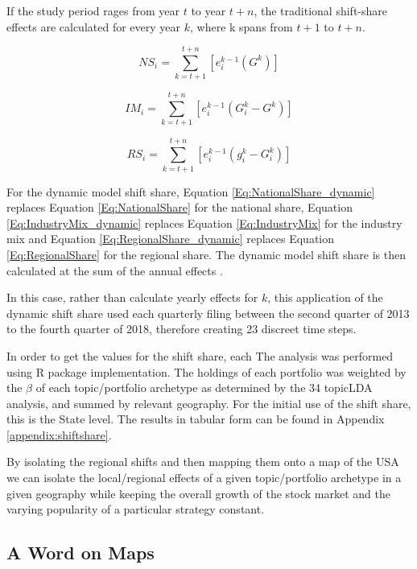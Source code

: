 If the study period rages from year $t$ to year $t+n$, the traditional shift-share effects are calculated for every year $k$, where k spans from $t+1$ to $t+n$. 

\begin{equation}
    NS_{i} = \sum_{k=t+1}^{t+n}[e^{k-1}_{i}(G^{k})]
    \label{Eq:NationalShare_dynamic}
\end{equation}

\begin{equation}
    IM_{i} = \sum_{k=t+1}^{t+n}[e^{k-1}_i(G^{k}_{i}-G^{k})]
     \label{Eq:IndustryMix_dynamic}
\end{equation}

\begin{equation}
    RS_{i} = \sum_{k=t+1}^{t+n}[e^{k-1}_i(g^{k}_{i} - G^{k}_{i} )]
        \label{Eq:RegionalShare_dynamic}
\end{equation}

For the dynamic model shift share, Equation \ref{Eq:NationalShare_dynamic} replaces Equation \ref{Eq:NationalShare} for the national share, Equation \ref{Eq:IndustryMix_dynamic} replaces Equation \ref{Eq:IndustryMix}  for the industry mix and Equation \ref{Eq:RegionalShare_dynamic} replaces Equation \ref{Eq:RegionalShare} for the regional share.  The dynamic model shift share is then calculated at the sum of the annual effects \citep{BarffKnight88}.  

In this case, rather than calculate yearly effects for $k$, this application of the dynamic shift share used each quarterly filing between the second quarter of 2013 to the fourth quarter of 2018, therefore creating 23 discreet time steps.

In order to get the values for the shift share, each 
The analysis was performed using \cite{Soudis2019} R package implementation. The holdings of each portfolio was weighted by the $\beta$ of each topic/portfolio archetype as determined by the 34 topicLDA analysis, and summed by relevant geography.  For the initial use of the shift share, this is the State level. The results in tabular form can be found in Appendix \ref{appendix:shiftshare}.

By isolating the regional shifts and then mapping them onto a map of the USA we can isolate the local/regional effects of a given topic/portfolio archetype in a given geography while keeping the overall growth of the stock market and the varying popularity of a particular strategy constant. 

\subsection{A Word on Maps}

